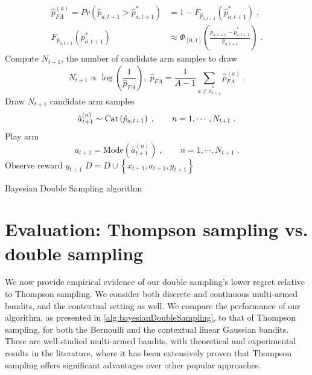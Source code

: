 \documentclass[10pt]{article}
\newcommand{\Cat}{{\rm Cat}}
\begin{document}
\begin{algorithm}
\begin{algorithmic}
		\begin{equation}
		\begin{split}
		\hat{p}_{FA}^{(a)} =Pr\left(\hat{p}_{a,t+1} > \hat{p}^*_{a,t+1} \right) &= 1 - F_{\hat{p}_{a,t+1}}(\hat{p}^*_{a,{t+1}}) \; , \\
		F_{\hat{p}_{a,t+1}}(p^*_{a,{t+1}}) &\approx \Phi_{[0,1]}\left(\frac{\hat{p}_{a,t+1} - \hat{p}^*_{a,{t+1}}}{\hat{\sigma}_{a,t+1}}\right) \;.
		\end{split}
		\end{equation}
		\EndFor
		\State Compute $N_{t+1}$, the number of candidate arm samples to draw
		\begin{equation}
		N_{t+1} \propto \log\left(\frac{1}{\hat{p}_{FA}}\right), \; \hat{p}_{FA}=\frac{1}{A-1}\sum_{a \neq \hat{a}_{t+1}^*}\hat{p}_{FA}^{(a)}\; .
		\end{equation}
		\State Draw $N_{t+1}$ candidate arm samples
		\begin{equation}
		\hat{a}_{t+1}^{(n)} \sim \Cat \left(\hat{p}_{a,t+1}\right) \; , \qquad n=1,\cdots, N_{t+1} \; .
		\end{equation}
		\State Play arm
		\begin{equation}
		a_{t+1} = \text{Mode}\left(\hat{a}_{t+1}^{(n)}\right) \; , \qquad  n=1,\cdots,N_{t+1} \;.
		\end{equation}
		\State Observe reward $y_{t+1}$
		\State $D=D \cup \left\{x_{t+1}, a_{t+1}, y_{t+1}\right\}$
		\EndFor
	\end{algorithmic}
	\caption{Bayesian Double Sampling algorithm}
	\label{alg:bayesianDoubleSampling}
\end{algorithm}

\section{Evaluation: Thompson sampling vs. double sampling}
\label{sec:evaluation}

We now provide empirical evidence of our double sampling's lower regret relative to Thompson sampling. We consider both discrete and continuous multi-armed bandits, and the contextual setting as well. We compare the performance of our algorithm, as presented in \autoref{alg:bayesianDoubleSampling}, to that of Thompson sampling, for both the Bernoulli and the contextual linear Gaussian bandits. These are well-studied multi-armed bandits, with theoretical and experimental results in the literature, where it has been extensively proven that Thompson sampling offers significant advantages over other popular approaches.
\end{document}
